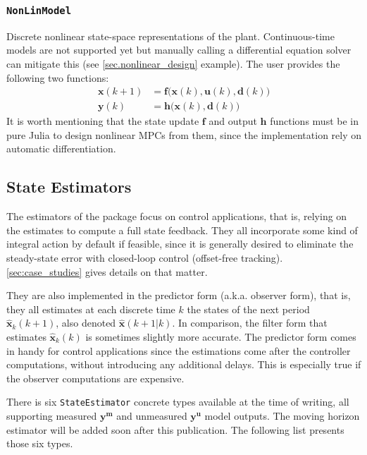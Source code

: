 \subsubsection{\textnormal{\texttt{NonLinModel}}}

Discrete nonlinear state-space representations of the plant. Continuous-time models are not supported yet but manually calling a differential equation solver can mitigate this (see \cref{sec.nonlinear_design} example). The user provides the following two functions:
\begin{subequations}
\begin{align}
    \mathbf{x}(k+1) &= \mathbf{f}\big(\mathbf{x}(k), \mathbf{u}(k), \mathbf{d}(k)\big) \\
    \mathbf{y}(k)   &= \mathbf{h}\big( \mathbf{x}(k), \mathbf{d}(k) \big)
\end{align}
\end{subequations}
It is worth mentioning that the state update $\mathbf{f}$ and output $\mathbf{h}$ functions must be in pure Julia to design nonlinear MPCs from them, since the implementation rely on automatic differentiation.

\subsection{State Estimators}

The estimators of the package focus on control applications, that is, relying on the estimates to compute a full state feedback. They all incorporate some kind of integral action by default if feasible, since it is generally desired to eliminate the steady-state error with closed-loop control (offset-free tracking). \cref{sec:case_studies} gives details on that matter.

They are also implemented in the predictor form (a.k.a. observer form), that is, they all estimates at each discrete time $k$ the states of the next period $\mathbf{\hat{x}}_k(k+1)$, also denoted $\mathbf{\hat{x}}(k+1|k)$. In comparison, the filter form that estimates $\mathbf{\hat{x}}_k(k)$ is sometimes slightly more accurate. The predictor form comes in handy for control applications since the estimations come after the controller computations, without introducing any additional delays. This is especially true if the observer computations are expensive.

There is six \texttt{StateEstimator} concrete types available at the time of writing, all supporting measured $\mathbf{y^m}$ and unmeasured $\mathbf{y^u}$ model outputs. The moving horizon estimator will be added soon after this publication. The following list presents those six types.

